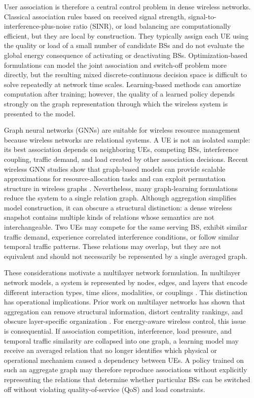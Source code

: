 \documentclass[journal]{IEEEtran}
\begin{document}
User association is therefore a central control problem in dense
wireless networks. Classical association rules based on received signal
strength, signal-to-interference-plus-noise ratio (SINR), or load balancing are
computationally efficient, but they are local by construction. They typically
assign each UE using the quality or load of a small number of candidate BSs and
do not evaluate the global energy consequence of activating or
deactivating BSs. Optimization-based formulations can model the joint
association and switch-off problem more directly, but the resulting mixed
discrete-continuous decision space is difficult to solve repeatedly at network
time scales. Learning-based methods can amortize computation after training;
however, the quality of a learned policy
depends strongly on the graph representation through which the wireless system
is presented to the model.

Graph neural networks (GNNs) are suitable for wireless resource management
because wireless networks are relational systems. A UE is not an isolated
sample: its best association depends on neighboring UEs, competing BSs,
interference coupling, traffic demand, and load created by other association
decisions. Recent wireless GNN studies show that graph-based models can provide
scalable approximations for resource-allocation tasks and can exploit
permutation structure in wireless graphs \cite{eisen2020optimal,shen2021scalable}.
Nevertheless, many graph-learning formulations reduce the system to a single
relation graph. Although aggregation simplifies model construction, it can
obscure a structural distinction: a dense wireless snapshot contains multiple
kinds of relations whose semantics are not interchangeable. Two UEs may compete for the
same serving BS, exhibit similar traffic demand, experience correlated
interference conditions, or follow similar temporal traffic patterns. These
relations may overlap, but they are not equivalent and should not necessarily
be represented by a single averaged graph.

These considerations motivate a multilayer network formulation. In multilayer
network models, a system is represented by nodes, edges, and layers that
encode different interaction types, time slices, modalities, or couplings
\cite{kivela2014multilayer,dedomenico2013mathematical,boccaletti2014structure}.
This distinction has operational implications. Prior work on multilayer
networks has
shown that aggregation can remove structural information, distort centrality
rankings, and obscure layer-specific organization
\cite{dedomenico2015reducibility,dedomenico2015versatile}. For energy-aware
wireless control, this issue is consequential. If association competition,
interference, load pressure, and temporal traffic similarity are collapsed into
one graph, a learning model may receive an averaged relation that no longer
identifies which physical or operational mechanism caused a dependency between
UEs. A policy trained on such an aggregate graph may therefore reproduce
associations without explicitly representing the relations that determine
whether particular BSs can be switched off without violating
quality-of-service (QoS) and load constraints.
\end{document}
